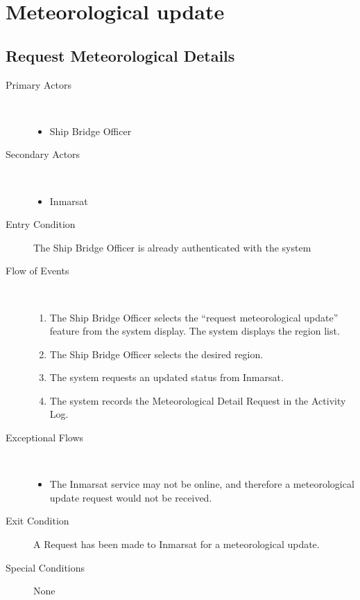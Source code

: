 \documentclass[a4paper,10pt]{report}
\begin{document}
\chapter{Meteorological update}
\section{Request Meteorological Details}
\begin{description}
\item[Primary Actors] \
  \begin{itemize}
  \item Ship Bridge Officer
  \end{itemize}
\item[Secondary Actors] \
  \begin{itemize}
  \item Inmarsat
  \end{itemize}
\item[Entry Condition]
  The Ship Bridge Officer is already authenticated with the system
\item[Flow of Events] \
  \begin{enumerate}
  \item The Ship Bridge Officer selects the ``request meteorological update'' feature from the system display. The system displays the region list.
  \item The Ship Bridge Officer selects the desired region.
  \item The system requests an updated status from Inmarsat.
    \item The system records the Meteorological Detail Request in the Activity Log.
  \end{enumerate}
\item[Exceptional Flows] \
  \begin{itemize}
  \item The Inmarsat service may not be online, and therefore a meteorological update request would not be received.
  \end{itemize}
\item[Exit Condition]
  A Request has been made to Inmarsat for a meteorological update.
\item[Special Conditions] None
\end{description}
\end{document}
